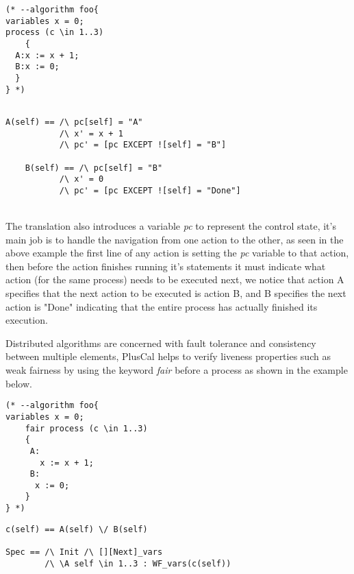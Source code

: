 \documentclass{thesul}
\begin{document}
 
\noindent\begin{minipage}{.45\textwidth}
\begin{lstlisting}[caption = PlusCal, frame = tlrb, firstnumber = 1]
(* --algorithm foo{
variables x = 0;
process (c \in 1..3)
    {
  A:x := x + 1;
  B:x := 0;
  }
} *)

\end{lstlisting}
\end{minipage}\hfill
\begin{minipage}{.45\textwidth}
\begin{lstlisting}[caption = TLA+ Translation, frame = tlrb, firstnumber = 1]

A(self) == /\ pc[self] = "A"
           /\ x' = x + 1
           /\ pc' = [pc EXCEPT ![self] = "B"]

	B(self) == /\ pc[self] = "B"
           /\ x' = 0
           /\ pc' = [pc EXCEPT ![self] = "Done"]
\end{lstlisting}
\end{minipage}
  
 
\hfill\\
The translation also introduces a variable \textit{pc} to represent the control state, it's main job is to handle the navigation from one action to the other, as seen in the above example the first line of any action is setting the \textit{pc} variable to that action, then before the action finishes running it's statements it must indicate what action (for the same process) needs to be executed next, we notice that action A specifies that the next action to be executed is action B, and B specifies the next action is "Done" indicating that the entire process has actually finished its execution.

Distributed algorithms are concerned with fault tolerance and consistency between multiple elements, PlusCal helps to verify liveness properties such as weak fairness by using the keyword \textit{fair} before a process as shown in the example below.

 
\noindent\begin{minipage}{.45\textwidth}
\begin{lstlisting}[caption = PlusCal, frame = tlrb, firstnumber = 1]
(* --algorithm foo{
variables x = 0;
    fair process (c \in 1..3)
    {
     A:
       x := x + 1;
     B:
      x := 0;
    }
} *)

\end{lstlisting}
\end{minipage}\hfill
\begin{minipage}{.45\textwidth}
\begin{lstlisting}[caption = TLA+ Translation, frame = tlrb, firstnumber = 1]
c(self) == A(self) \/ B(self)

Spec == /\ Init /\ [][Next]_vars
        /\ \A self \in 1..3 : WF_vars(c(self))
\end{lstlisting}
\end{minipage}
  
\end{document}
